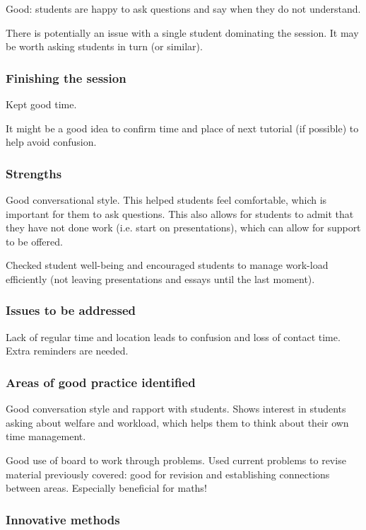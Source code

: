 Good: students are happy to ask questions and say when they do not understand.

There is potentially an issue with a single student dominating the session. It may be worth asking students in turn (or similar).

\subsubsection{Finishing the session}

Kept good time.

It might be a good idea to confirm time and place of next tutorial (if possible) to help avoid confusion.

\subsubsection{Strengths}

Good conversational style. This helped students feel comfortable, which is important for them to ask questions. This also allows for students to admit that they have not done work (i.e. start on presentations), which can allow for support to be offered.

Checked student well-being and encouraged students to manage work-load efficiently (not leaving presentations and essays until the last moment).

\subsubsection{Issues to be addressed}

Lack of regular time and location leads to confusion and loss of contact time. Extra reminders are needed.

\subsubsection{Areas of good practice identified}

Good conversation style and rapport with students. Shows interest in students asking about welfare and workload, which helps them to think about their own time management.

Good use of board to work through problems. Used current problems to revise material previously covered: good for revision and establishing connections between areas. Especially beneficial for maths!

\subsubsection{Innovative methods}

